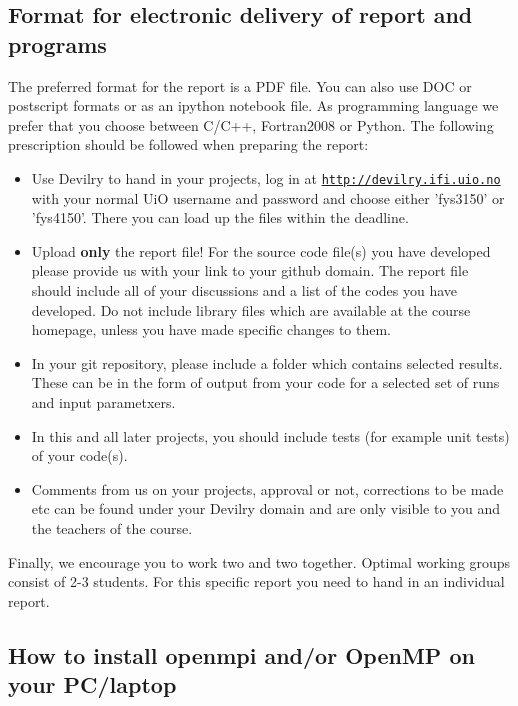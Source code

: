 \documentclass[10pt,showpacs,preprintnumbers,footinbib,amsmath,amssymb,aps,prl,twocolumn,groupedaddress,superscriptaddress,showkeys]{revtex4-1}
\begin{document}
\noindent
\subsection*{Format for electronic delivery of report and programs}

The preferred format for the report is a PDF file. You can also use DOC or postscript formats or as an ipython notebook file.  As programming language we prefer that you choose between C/C++, Fortran2008 or Python. The following prescription should be followed when preparing the report:

\begin{itemize}
  \item Use Devilry to hand in your projects, log in  at  \href{{http://devilry.ifi.uio.no}}{\nolinkurl{http://devilry.ifi.uio.no}} with your normal UiO username and password and choose either 'fys3150' or 'fys4150'. There you can load up the files within the deadline.

  \item Upload \textbf{only} the report file!  For the source code file(s) you have developed please provide us with your link to your github domain.  The report file should include all of your discussions and a list of the codes you have developed.  Do not include library files which are available at the course homepage, unless you have made specific changes to them.

  \item In your git repository, please include a folder which contains selected results. These can be in the form of output from your code for a selected set of runs and input parametxers.

  \item In this and all later projects, you should include tests (for example unit tests) of your code(s).

  \item Comments  from us on your projects, approval or not, corrections to be made  etc can be found under your Devilry domain and are only visible to you and the teachers of the course.
\end{itemize}

\noindent
Finally, 
we encourage you to work two and two together. Optimal working groups consist of 
2-3 students. For this specific report you need to hand in an individual report.



\subsection*{How to install openmpi and/or OpenMP on your PC/laptop}
\end{document}

